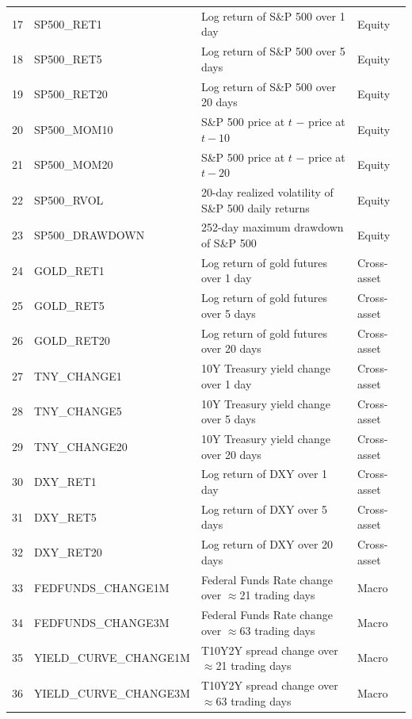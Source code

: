 \documentclass[12pt]{article}
\begin{document}
\begin{table}[H]
\begin{tabular}{llll}
\midrule
17 & SP500\_RET1       & Log return of S\&P 500 over 1 day                          & Equity \\
18 & SP500\_RET5       & Log return of S\&P 500 over 5 days                         & Equity \\
19 & SP500\_RET20      & Log return of S\&P 500 over 20 days                        & Equity \\
20 & SP500\_MOM10      & S\&P 500 price at $t$ $-$ price at $t-10$                  & Equity \\
21 & SP500\_MOM20      & S\&P 500 price at $t$ $-$ price at $t-20$                  & Equity \\
22 & SP500\_RVOL       & 20-day realized volatility of S\&P 500 daily returns        & Equity \\
23 & SP500\_DRAWDOWN   & 252-day maximum drawdown of S\&P 500                       & Equity \\
\midrule
24 & GOLD\_RET1        & Log return of gold futures over 1 day                      & Cross-asset \\
25 & GOLD\_RET5        & Log return of gold futures over 5 days                     & Cross-asset \\
26 & GOLD\_RET20       & Log return of gold futures over 20 days                    & Cross-asset \\
27 & TNY\_CHANGE1         & 10Y Treasury yield change over 1 day                       & Cross-asset \\
28 & TNY\_CHANGE5         & 10Y Treasury yield change over 5 days                      & Cross-asset \\
29 & TNY\_CHANGE20        & 10Y Treasury yield change over 20 days                     & Cross-asset \\
30 & DXY\_RET1         & Log return of DXY over 1 day                               & Cross-asset \\
31 & DXY\_RET5         & Log return of DXY over 5 days                              & Cross-asset \\
32 & DXY\_RET20        & Log return of DXY over 20 days                             & Cross-asset \\
\midrule
33 & FEDFUNDS\_CHANGE1M   & Federal Funds Rate change over $\approx$21 trading days    & Macro \\
34 & FEDFUNDS\_CHANGE3M   & Federal Funds Rate change over $\approx$63 trading days    & Macro \\
35 & YIELD\_CURVE\_CHANGE1M & T10Y2Y spread change over $\approx$21 trading days      & Macro \\
36 & YIELD\_CURVE\_CHANGE3M & T10Y2Y spread change over $\approx$63 trading days      & Macro \\
\bottomrule
\end{tabular}
\end{table}
\end{document}
